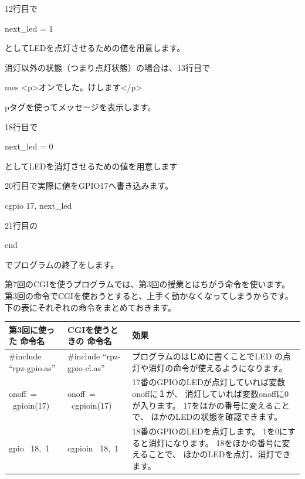 \documentclass[a4paper,12pt,dvipdfmx]{jarticle}
\newcounter {PagePtr}
\begin{document}
\bigskip

12行目で

next\_led = 1

としてLEDを点灯させるための値を用意します。

\bigskip

消灯以外の状態（つまり点灯状態）の場合は、13行目で

mes
	{\textquotedbl}{\textless}p{\textgreater}オンでした。けします{\textless}/p{\textgreater}{\textquotedbl}

pタグを使ってメッセージを表示します。

\bigskip

18行目で

next\_led = 0

としてLEDを消灯させるための値を用意します

\bigskip

20行目で実際に値をGPIO17へ書き込みます。

cgpio 17, next\_led




\bigskip

21行目の

end

でプログラムの終了をします。


\bigskip



第7回のCGIを使うプログラムでは、第3回の授業とはちがう命令を使います。\\
第3回の命令でCGIを使おうとすると、上手く動かなくなってしまうからです。\\
下の表にそれぞれの命令をまとめておきます。\\

\clearpage
{}\label{P:gpio}
\begin{flushleft}
	\tablefirsthead{}
	\tablehead{}
	\tabletail{}
	\tablelasttail{}
	\begin{supertabular}{|m{5.0cm}|m{5.5cm}|m{7.0cm}|}
		\hline
		第3回に使った
		命令名 &
		CGIを使うときの
		命令名&
		効果
		\\\hline

		\#include “rpz-gpio.as”&
		\#include “rpz-gpio-cl.as”&
		プログラムのはじめに書くことでLED
		の点灯や消灯の命令が使えるようになります。
		\\\hline

		onoff\ = \ gpioin(17)&

		onoff\ = \ cgpioin(17)&
		17番のGPIOのLEDが点灯していれば変数onoffに１が、
		消灯していれば変数onoffに0が入ります。
		17をほかの番号に変えることで、
		ほかのLEDの状態を確認できます。
		\\\hline

		gpio \ 18,\ 1&
		cgpioin \ 18,\ 1&
		18番のGPIOのLEDを点灯します。
		1を0にすると消灯になります。
		18をほかの番号に変えることで、
		ほかのLEDを点灯、消灯できます。
		\\\hline



	\end{supertabular}
\end{flushleft}
\end{document}
